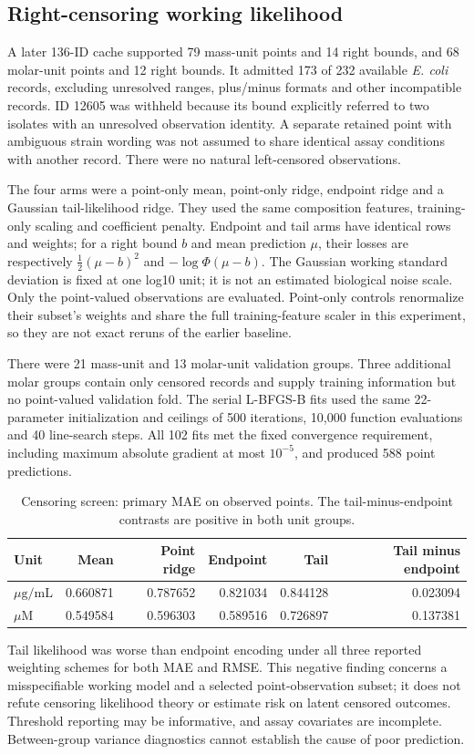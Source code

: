 \documentclass[12pt,a4paper]{article}
\newcommand{\ug}{\ensuremath{\mu\mathrm{g}/\mathrm{mL}}}
\begin{document}
\subsection{Right-censoring working likelihood}
A later 136-ID cache supported 79 mass-unit points and 14 right bounds, and 68 molar-unit points and 12 right bounds. It admitted 173 of 232 available \textit{E. coli} records, excluding unresolved ranges, plus/minus formats and other incompatible records. ID 12605 was withheld because its bound explicitly referred to two isolates with an unresolved observation identity. A separate retained point with ambiguous strain wording was not assumed to share identical assay conditions with another record. There were no natural left-censored observations.

The four arms were a point-only mean, point-only ridge, endpoint ridge and a Gaussian tail-likelihood ridge. They used the same composition features, training-only scaling and coefficient penalty. Endpoint and tail arms have identical rows and weights; for a right bound $b$ and mean prediction $\mu$, their losses are respectively $\tfrac12(\mu-b)^2$ and $-\log\Phi(\mu-b)$. The Gaussian working standard deviation is fixed at one log10 unit; it is not an estimated biological noise scale. Only the point-valued observations are evaluated. Point-only controls renormalize their subset's weights and share the full training-feature scaler in this experiment, so they are not exact reruns of the earlier baseline.

There were 21 mass-unit and 13 molar-unit validation groups. Three additional molar groups contain only censored records and supply training information but no point-valued validation fold. The serial L-BFGS-B fits used the same 22-parameter initialization and ceilings of 500 iterations, 10,000 function evaluations and 40 line-search steps. All 102 fits met the fixed convergence requirement, including maximum absolute gradient at most $10^{-5}$, and produced 588 point predictions.

\begin{table}[htbp]\centering\singlespacing\small
\caption{Censoring screen: primary MAE on observed points. The tail-minus-endpoint contrasts are positive in both unit groups.}
\begin{tabular}{lrrrrr}\toprule
Unit & Mean & Point ridge & Endpoint & Tail & Tail minus endpoint\\\midrule
\ug & 0.660871 & 0.787652 & 0.821034 & 0.844128 & 0.023094\\
$\mu$M & 0.549584 & 0.596303 & 0.589516 & 0.726897 & 0.137381\\\bottomrule
\end{tabular}\end{table}
Tail likelihood was worse than endpoint encoding under all three reported weighting schemes for both MAE and RMSE. This negative finding concerns a misspecifiable working model and a selected point-observation subset; it does not refute censoring likelihood theory or estimate risk on latent censored outcomes. Threshold reporting may be informative, and assay covariates are incomplete. Between-group variance diagnostics cannot establish the cause of poor prediction.
\end{document}
